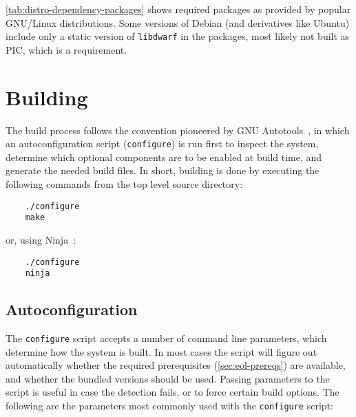 \autoref{tab:distro-dependency-packages} shows required packages as provided
by popular GNU/Linux distributions. Some versions of Debian (and derivatives
like Ubuntu) include only a static version of \verb|libdwarf| in the packages,
most likely not built as \gls{PIC}, which is a requirement.


\section{Building}

The build process follows the convention pioneered by GNU
Autotools~\cite{autotools-history}, in which an autoconfiguration script
(\verb|configure|) is run first to inspect the system, determine which
optional components are to be enabled at build time, and generate the needed
build files. In short, building \Eol* is done by executing the following
commands from the top level source directory:

\begin{verbatim}
	./configure
	make
\end{verbatim}

or, using Ninja~\cite{ninja-manual}:

\begin{verbatim}
	./configure
	ninja
\end{verbatim}


\subsection{Autoconfiguration}
  \label{sec:running-configure}

The \verb|configure| script accepts a number of command line parameters, which
determine how the system is built. In most cases the script will figure out
automatically whether the required prerequisites (\autoref{sec:eol-prereqs})
are available, and whether the bundled versions should be used. Passing
parameters to the script is useful in case the detection fails, or to force
certain build options.  The following are the parameters most commonly used
with the \verb|configure| script:

